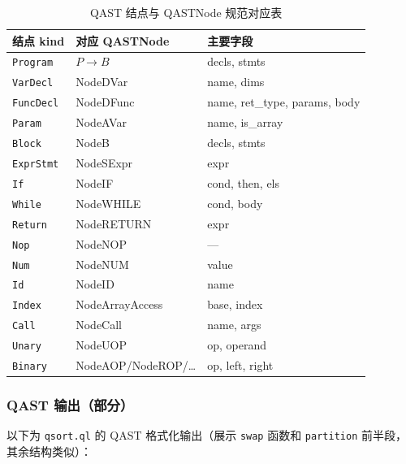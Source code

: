 \documentclass[12pt,a4paper]{ctexart}
\begin{document}
\begin{table}[H]
\centering
\caption{QAST 结点与 QASTNode 规范对应表}
\label{tab:qastnodes}
\begin{tabular}{lll}
\toprule
结点 kind & 对应 QASTNode & 主要字段 \\
\midrule
\texttt{Program}  & $P \to B$       & decls, stmts \\
\texttt{VarDecl}  & NodeDVar        & name, dims \\
\texttt{FuncDecl} & NodeDFunc       & name, ret\_type, params, body \\
\texttt{Param}    & NodeAVar        & name, is\_array \\
\texttt{Block}    & NodeB           & decls, stmts \\
\texttt{ExprStmt} & NodeSExpr       & expr \\
\texttt{If}       & NodeIF          & cond, then, els \\
\texttt{While}    & NodeWHILE       & cond, body \\
\texttt{Return}   & NodeRETURN      & expr \\
\texttt{Nop}      & NodeNOP         & — \\
\texttt{Num}      & NodeNUM         & value \\
\texttt{Id}       & NodeID          & name \\
\texttt{Index}    & NodeArrayAccess & base, index \\
\texttt{Call}     & NodeCall        & name, args \\
\texttt{Unary}    & NodeUOP         & op, operand \\
\texttt{Binary}   & NodeAOP/NodeROP/\ldots & op, left, right \\
\bottomrule
\end{tabular}
\end{table}

\subsubsection{QAST 输出（部分）}

以下为 \texttt{qsort.ql} 的 QAST 格式化输出（展示 \texttt{swap} 函数和 \texttt{partition}
前半段，其余结构类似）：
\end{document}
